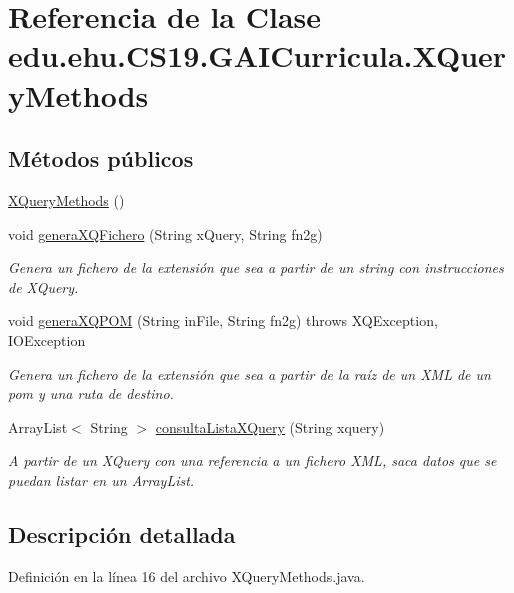 \hypertarget{a00032}{}\section{Referencia de la Clase edu.\+ehu.\+C\+S19.\+G\+A\+I\+Curricula.\+X\+Query\+Methods}
\label{a00032}
\subsection*{Métodos públicos}
\begin{DoxyCompactItemize}
\item 
\mbox{\hyperlink{a00032_ade5a845ccb94c1feb5420a2550243985}{X\+Query\+Methods}} ()
\item 
void \mbox{\hyperlink{a00032_a7d2040d47b8350ca48da7ce5b658fab2}{genera\+X\+Q\+Fichero}} (String x\+Query, String fn2g)
\begin{DoxyCompactList}\small\item\em Genera un fichero de la extensión que sea a partir de un string con instrucciones de X\+Query. \end{DoxyCompactList}\item 
void \mbox{\hyperlink{a00032_ae60f32c5f8b4ffe3f2bdd1f44976eacf}{genera\+X\+Q\+P\+OM}} (String in\+File, String fn2g)  throws X\+Q\+Exception, I\+O\+Exception 
\begin{DoxyCompactList}\small\item\em Genera un fichero de la extensión que sea a partir de la raíz de un X\+ML de un pom y una ruta de destino. \end{DoxyCompactList}\item 
Array\+List$<$ String $>$ \mbox{\hyperlink{a00032_a8b0ac4baf3bbd3829073a87325dd714d}{consulta\+Lista\+X\+Query}} (String xquery)
\begin{DoxyCompactList}\small\item\em A partir de un X\+Query con una referencia a un fichero X\+ML, saca datos que se puedan listar en un Array\+List. \end{DoxyCompactList}\end{DoxyCompactItemize}


\subsection{Descripción detallada}


Definición en la línea 16 del archivo X\+Query\+Methods.\+java.



